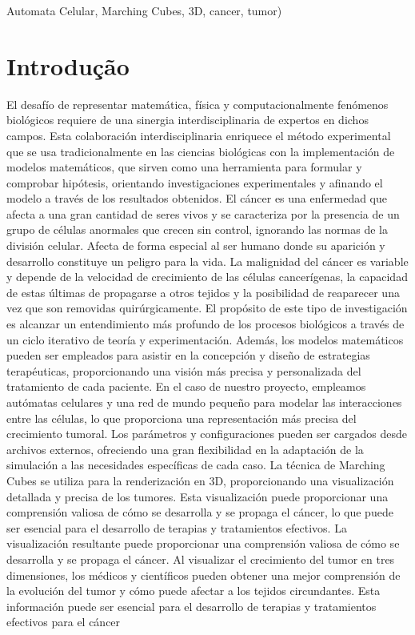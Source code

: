 \documentclass[a4paper,11pt]{article}
\begin{document}
{{\vskip 0.2cm  %


{\small{ %
 Automata Celular, Marching Cubes, 3D, cancer, tumor)
}}
}


\section*{Introdução}

El desafío de representar matemática, física y computacionalmente fenómenos biológicos requiere de una sinergia interdisciplinaria de expertos en dichos campos. Esta colaboración interdisciplinaria enriquece el método experimental que se usa tradicionalmente en las ciencias biológicas con la implementación de modelos matemáticos, que sirven como una herramienta para formular y comprobar hipótesis, orientando investigaciones experimentales y afinando el modelo a través de los resultados obtenidos.
El cáncer es una enfermedad que afecta a una gran cantidad de seres vivos y se caracteriza por la presencia de un grupo de células anormales que crecen sin control, ignorando las normas de la división celular. Afecta de forma especial al ser humano donde su aparición y desarrollo constituye un peligro para la vida. La malignidad del cáncer es variable y depende de la velocidad de crecimiento de las células cancerígenas, la capacidad de estas últimas de propagarse a otros tejidos y la posibilidad de reaparecer una vez que son removidas quirúrgicamente.
El propósito de este tipo de investigación es alcanzar un entendimiento más profundo de los procesos biológicos a través de un ciclo iterativo de teoría y experimentación. Además, los modelos matemáticos pueden ser empleados para asistir en la concepción y diseño de estrategias terapéuticas, proporcionando una visión más precisa y personalizada del tratamiento de cada paciente.
En el caso de nuestro proyecto, empleamos autómatas celulares y una red de mundo pequeño para modelar las interacciones entre las células, lo que proporciona una representación más precisa del crecimiento tumoral. Los parámetros y configuraciones pueden ser cargados desde archivos externos, ofreciendo una gran flexibilidad en la adaptación de la simulación a las necesidades específicas de cada caso.
La técnica de Marching Cubes se utiliza para la renderización en 3D, proporcionando una visualización detallada y precisa de los tumores. Esta visualización puede proporcionar una comprensión valiosa de cómo se desarrolla y se propaga el cáncer, lo que puede ser esencial para el desarrollo de terapias y tratamientos efectivos. La visualización resultante puede proporcionar una comprensión valiosa de cómo se desarrolla y se propaga el cáncer. Al visualizar el crecimiento del tumor en tres dimensiones, los médicos y científicos pueden obtener una mejor comprensión de la evolución del tumor y cómo puede afectar a los tejidos circundantes. Esta información puede ser esencial para el desarrollo de terapias y tratamientos efectivos para el cáncer


}
\end{document}
